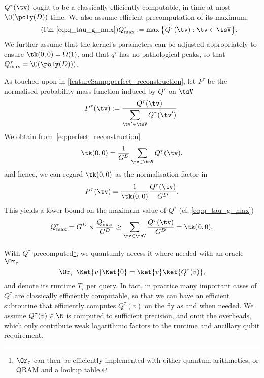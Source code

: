 $Q^{\tau}(\tv)$ ought to be a classically efficiently computable, in time at most $\O(\poly(D))$ time.
We also assume efficient precomputation of its maximum,
\begin{equation*}
  \tag{I'm \ref{eq:q_tau_g_max}}
  {Q_{\max}^{\tau}}:=\max\big\{Q^{\tau}(\tv):\tv\in\tsV\big\}.
\end{equation*}
We further assume that the kernel's parameters can be adjusted appropriately to ensure $\tk(0,0)=\Omega(1)$, and that $q^\tau$ has no pathological peaks, so that $Q_{\max}^{\tau}=\O(\poly(D)))$.

\begin{remark*}
  As touched upon in \cref{featureSamp:perfect_reconstruction}, let $P^{\tau}$ be the normalised probability mass function induced by $Q^{\tau}$ on $\tsV$ 
  \begin{equation}
    \label{eq:normalisation_p_tau}
    P^{\tau}(\tv) := \frac{Q^{\tau}(\tv)}{\displaystyle\sum_{\tv'\in\tsV}Q^{\tau}(\tv')}.
  \end{equation}
  We obtain from~\cref{eq:perfect_reconstruction}
  \begin{equation}
    \tk(0,0)=\frac{1}{{G}^{D}}\sum_{\tv\in\tsV }Q^{\tau}(\tv),
  \end{equation}
  and hence, we can regard $\tk(0,0)$ as the normalisation factor in
  \begin{equation}
    P^{\tau}(\tv)=\frac{1}{\tk(0,0)} \frac{Q^{\tau}(\tv)}{G^D}.
  \end{equation}
  This yields a lower bound on the maximum value of $Q^{\tau}$ (cf. \eqref{eq:q_tau_g_max})
  \begin{equation}
    Q_{\max}^{\tau}=G^D\times\frac{Q_{\max}^{\tau}}{G^D}\geq \sum_{\tv\in\tsV}\frac{Q^{\tau}(\tv)}{G^D}=\tk(0,0).
  \end{equation}
  \end{remark*}
  

With $Q^{\tau}$ precomputed\footnote{$\Or_\tau$ can then be efficiently implemented with either quantum arithmetics, or QRAM and a lookup table.}, we quantumly access it where needed with an oracle $\Or_\tau$
\begin{equation}
  \label{eq:oracle_tau_definition}
\Or_\tau~\Ket{v}\Ket{0} = \ket{v}\ket{Q^{\tau}(v)},
\end{equation}
and denote its runtime $T_\tau$ per query. In fact, in practice many important cases of $Q^{\tau}$ are classically efficiently computable, so that we can have an efficient subroutine that efficiently computes $Q^{\tau}(v)$ on the fly as and when needed. We assume $Q^{\tau}(v)\in\R$ is computed to sufficient precision, and omit the overheads, which only contribute weak logarithmic factors to the runtime and ancillary qubit requirement.

